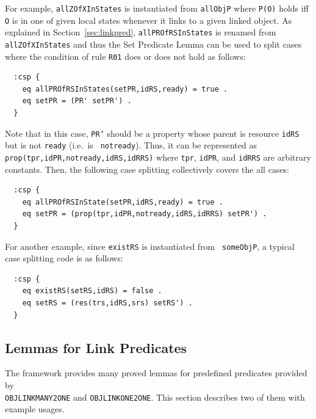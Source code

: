 \documentclass[12pt]{report}
\newcommand{\stt}[1]{{\small{\tt {#1}}}}
\begin{document}
For example, {\tt allZOfXInStates} is instantiated from {\tt allObjP}
where \stt{P(O)} holds iff {\tt O} is in one of given local
states whenever it links to a given linked object.  As explained in
Section~\ref{sec:linkpred}, {\tt allPROfRSInStates} is renamed
from {\tt allZOfXInStates} and thus the Set Predicate Lemma can be used to
split cases where the condition of rule {\tt R01} does or does not
hold as follows:
\small
\begin{verbatim}
  :csp {
    eq allPROfRSInStates(setPR,idRS,ready) = true .
    eq setPR = (PR' setPR') .
  }
\end{verbatim}
\normalsize
Note that in this case, {\tt PR'} should be a property whose parent is
resource {\tt idRS} but is not {\tt ready} (i.e.\ is {\tt
  notready}). Thus, it can be represented as
\stt{prop(tpr,idPR,notready,idRS,idRRS)} where {\tt tpr}, {\tt idPR},
and {\tt idRRS} are arbitrary constants. Then, the following case splitting
collectively covers the all cases:
\small
\begin{verbatim}
  :csp {
    eq allPROfRSInState(setPR,idRS,ready) = true .
    eq setPR = (prop(tpr,idPR,notready,idRS,idRRS) setPR') .
  }
\end{verbatim}
\normalsize

For another example, since {\tt existRS} is instantiated from {\tt
  someObjP}, a typical case splitting code is as follows:
\small
\begin{verbatim}
  :csp {
    eq existRS(setRS,idRS) = false .
    eq setRS = (res(trs,idRS,srs) setRS') .
  }
\end{verbatim}
\normalsize

\subsection{Lemmas for Link Predicates}
\label{sec:linklemma}
The framework provides many proved lemmas for predefined predicates
provided by\\ {\tt OBJLINKMANY2ONE} and {\tt OBJLINKONE2ONE}. This
section describes two of them with example usages.
\end{document}
